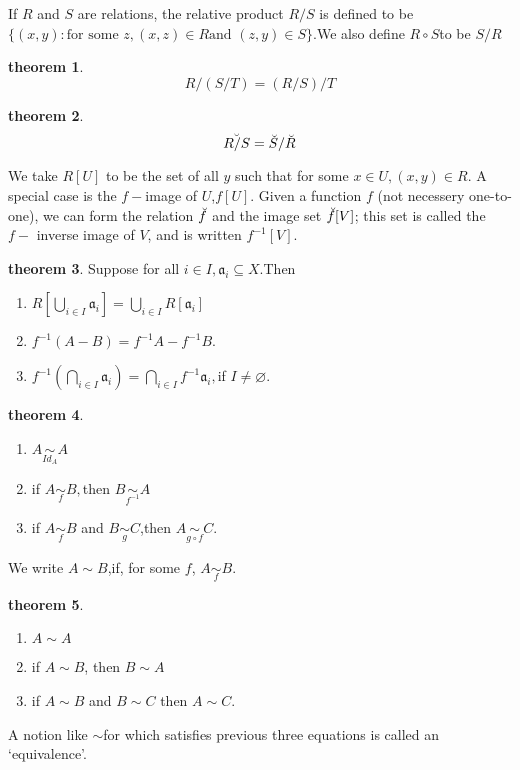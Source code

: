 \documentclass[a4paper,11pt]{article}%
\theoremstyle{remark}
\theoremstyle{definition}
\newtheorem{theorem}{theorem}[section]
\theoremstyle{definition}
\theoremstyle{plain}
\theoremstyle{definition}
\begin{document}
If $R$ and $S$ are relations, the relative product $R/S$ is defined to
be $\{(x,y):\text{for some }z,(x,z)\in R \text{and }(z,y)\in S\}$.We also define
$R\circ S$to be $S/R$
\begin{theorem}
    \[R/(S/T)=(R/S)/T\]
\end{theorem}
\begin{theorem}
    \[\Breve{R/S}=\Breve{S}/\Breve{R}\]
\end{theorem}
We take $R[U]$ to be the set of all $y$ such that for some $x\in U,(x,y)\in R$.
A special case is the $f-$image of $U$,$f[U]$. Given a function $f$ (not necessery one-to-one),
we can form  the relation $\Breve{f}$ and the image set $\Breve{f}[V]$; this set is called the $f-$
inverse image of $V$, and is written $f^{-1}[V]$.
\begin{theorem}
    Suppose for all $i\in I,\mathfrak{a}_i\subseteq X$.Then
    \begin{enumerate}
        \item $R[\bigcup_{i\in I}\mathfrak{a}_i]=\bigcup_{i\in I}R[\mathfrak{a}_i]$
        \item $f^{-1}(A-B)=f^{-1}A-f^{-1}B.$
        \item $f^{-1}(\bigcap_{i\in I}\mathfrak{a}_i)=\bigcap_{i\in I}f^{-1}\mathfrak{a}_i,$if $I\neq \varnothing$.
    \end{enumerate}
\end{theorem}
\begin{theorem}
    \begin{enumerate}
        \item $A\underset{Id_A}{\sim}A$
        \item if $A\underset{f}{\sim}B,$then $B\underset{f^{-1}}{\sim}A$
        \item if $A\underset{f}{\sim}B$ and $B\underset{g}{\sim}C$,then $A\underset{g\circ f}{\sim}C$.
    \end{enumerate}
\end{theorem}
We write $A\sim B$,if, for some $f$, $A\underset{f}{\sim}B$.
\begin{theorem}
\begin{enumerate}
    \item $A\sim A$
    \item if $A\sim B$, then $B\sim A$
    \item if $A\sim B$ and $B\sim C$ then $A\sim C$.
\end{enumerate}
\end{theorem}
A notion like $\sim $for which satisfies previous three equations is called an `equivalence'.
\end{document}
